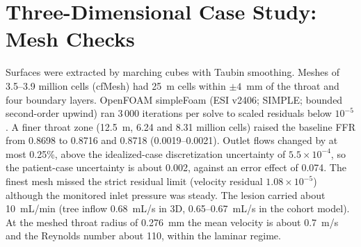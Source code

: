 \documentclass[journal,twoside,web,onecolumn]{ieeecolor}
\begin{document}
\FloatBarrier
{}
\section{Three-Dimensional Case Study: Mesh Checks}\label{sec:cfd}
Surfaces were extracted by marching cubes with Taubin smoothing. Meshes of 3.5--3.9 million cells (cfMesh) had
25~\textmu m cells within $\pm 4$~mm of the throat and four boundary layers. OpenFOAM simpleFoam (ESI v2406; SIMPLE;
bounded second-order upwind) ran 3\,000 iterations per solve to scaled residuals below $10^{-5}$. A finer throat zone (12.5~\textmu m, 6.24 and 8.31 million cells) raised the baseline FFR from 0.8698 to 0.8716 and 0.8718
(0.0019--0.0021). Outlet flows changed by at most 0.25\%, above the idealized-case discretization uncertainty of $5.5\times10^{-4}$,
so the patient-case uncertainty is about 0.002, against an error effect of 0.074. The finest mesh missed the strict residual limit (velocity residual $1.08\times10^{-5}$) although the monitored inlet pressure was steady. The lesion carried about 10~mL/min (tree inflow 0.68~mL/s in 3D, 0.65--0.67~mL/s in the cohort model). At the meshed throat radius of 0.276~mm the mean velocity is about 0.7~m/s and the Reynolds number about 110, within the laminar regime.
\end{document}

